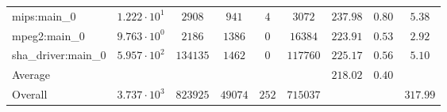 \begin{tabular}{|l|c|c|c|c|c|c|c|c|}
mips:main\_0            & $ 1.222 \cdot 10^{1}  $ & $ 2908   $ & $ 941   $ & $ 4   $ & $ 3072   $ & $ 237.98      $ & $ 0.80    $ & $ 5.38    $ \\
mpeg2:main\_0           & $ 9.763 \cdot 10^{0}  $ & $ 2186   $ & $ 1386  $ & $ 0   $ & $ 16384  $ & $ 223.91      $ & $ 0.53    $ & $ 2.92    $ \\
sha\_driver:main\_0     & $ 5.957 \cdot 10^{2}  $ & $ 134135 $ & $ 1462  $ & $ 0   $ & $ 117760 $ & $ 225.17      $ & $ 0.56    $ & $ 5.10    $ \\
\hline
Average                 & $                     $ & $        $ & $       $ & $     $ & $        $ & $ 218.02      $ & $ 0.40    $ & $         $ \\
\hline
Overall                 & $ 3.737 \cdot 10^{3}  $ & $ 823925 $ & $ 49074 $ & $ 252 $ & $ 715037 $ & $             $ & $         $ & $ 317.99  $ \\
\hline
\end{tabular}
